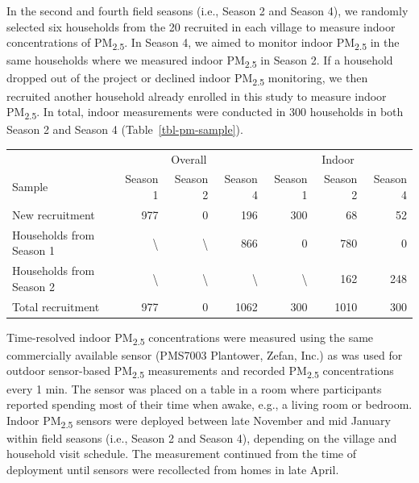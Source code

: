 \documentclass[
  letterpaper,
  DIV=11,
  numbers=noendperiod]{scrartcl}
\makeatletter
\renewenvironment{table}%
  {\renewcommand\familydefault\sfdefault
   \@float{table}}
  {\end@float}
\makeatother
\begin{document}
In the second and fourth field seasons (i.e., Season 2 and Season 4), we
randomly selected six households from the 20 recruited in each village
to measure indoor concentrations of PM\textsubscript{2.5}. In Season 4,
we aimed to monitor indoor PM\textsubscript{2.5} in the same households
where we measured indoor PM\textsubscript{2.5} in Season 2. If a
household dropped out of the project or declined indoor
PM\textsubscript{2.5} monitoring, we then recruited another household
already enrolled in this study to measure indoor PM\textsubscript{2.5}.
In total, indoor measurements were conducted in 300 households in both
Season 2 and Season 4 (Table~\ref{tbl-pm-sample}).

\hypertarget{tbl-pm-sample}{}
\begin{table}
\caption{\label{tbl-pm-sample}Household recruitment for overall and indoor air quality measurements. }\tabularnewline

\centering
\begin{tabular}{lrrrrrr}
\toprule
\multicolumn{1}{c}{ } & \multicolumn{3}{c}{Overall} & \multicolumn{3}{c}{Indoor} \\
\cmidrule(l{3pt}r{3pt}){2-4} \cmidrule(l{3pt}r{3pt}){5-7}
Sample & Season 1 & Season 2 & Season 4 & Season 1 & Season 2 & Season 4\\
\midrule
New recruitment & 977 & 0 & 196 & 300 & 68 & 52\\
Households from Season 1 & \textbackslash{} & \textbackslash{} & 866 & 0 & 780 & 0\\
Households from Season 2 & \textbackslash{} & \textbackslash{} & \textbackslash{} & \textbackslash{} & 162 & 248\\
Total recruitment & 977 & 0 & 1062 & 300 & 1010 & 300\\
\bottomrule
\end{tabular}
\end{table}

Time-resolved indoor PM\textsubscript{2.5} concentrations were measured
using the same commercially available sensor (PMS7003 Plantower, Zefan,
Inc.) as was used for outdoor sensor-based PM\textsubscript{2.5}
measurements and recorded PM\textsubscript{2.5} concentrations every 1
min. The sensor was placed on a table in a room where participants
reported spending most of their time when awake, e.g., a living room or
bedroom. Indoor PM\textsubscript{2.5} sensors were deployed between late
November and mid January within field seasons (i.e., Season 2 and Season
4), depending on the village and household visit schedule. The
measurement continued from the time of deployment until sensors were
recollected from homes in late April.
\end{document}
